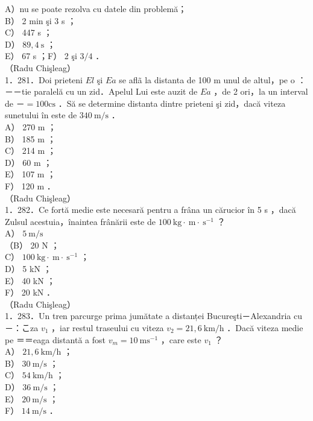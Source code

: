 \documentclass[10pt]{article}
\begin{document}
A）nu se poate rezolva cu datele din problemă；\\
B） 2 min şi 3 s ；\\
C） 447 s ；\\
D） $89,4 \mathrm{~s}$ ；\\
E） 67 s ；F） 2 şi $3 / 4$ ．\\
（Radu Chişleag）\\
1．281．Doi prieteni $E l$ şi $E a$ se aflã la distanta de 100 m unul de altul，pe o ：－－tie paralelă cu un zid．Apelul Lui este auzit de $E a$ ，de 2 ori，la un interval de －$=100 \mathrm{cs}$ ．Să se determine distanta dintre prieteni şi zid，dacă viteza sunetului în este de $340 \mathrm{~m} / \mathrm{s}$ ．\\
A） 270 m ；\\
B） 185 m ；\\
C） 214 m ；\\
D） 60 m ；\\
E） 107 m ；\\
F） 120 m ．\\
（Radu Chişleag）\\
1．282．Ce fortă medie este necesară pentru a frâna un cărucior în 5 s ，dacă Zulsul acestuia，înaintea frânării este de $100 \mathrm{~kg} \cdot \mathrm{~m} \cdot \mathrm{~s}^{-1}$ ？\\
A） $5 \mathrm{~m} / \mathrm{s}$\\
（B） 20 N ；\\
C） $100 \mathrm{~kg} \cdot \mathrm{~m} \cdot \mathrm{~s}^{-1}$ ；\\
D） 5 kN ；\\
E） 40 kN ；\\
F） 20 kN ．\\
（Radu Chişleag）\\
1．283．Un tren parcurge prima jumătate a distanței Bucureşti－Alexandria cu －：こza $v_{1}$ ，iar restul traseului cu viteza $v_{2}=21,6 \mathrm{~km} / \mathrm{h}$ ．Dacă viteza medie pe ＝＝eaga distantă a fost $v_{m}=10 \mathrm{~ms}^{-1}$ ，care este $v_{1}$ ？\\
A） $21,6 \mathrm{~km} / \mathrm{h}$ ；\\
B） $30 \mathrm{~m} / \mathrm{s}$ ；\\
C） $54 \mathrm{~km} / \mathrm{h}$ ；\\
D） $36 \mathrm{~m} / \mathrm{s}$ ；\\
E） $20 \mathrm{~m} / \mathrm{s}$ ；\\
F） $14 \mathrm{~m} / \mathrm{s}$ ．\\
\end{document}
